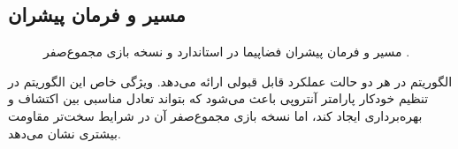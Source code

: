 \subsection{مسیر و فرمان پیشران}
\begin{figure}[H]
	\centering
	
	\caption{مسیر و فرمان پیشران فضاپیما در  استاندارد و نسخه بازی مجموع‌صفر .}
\end{figure}

الگوریتم  در هر دو حالت عملکرد قابل قبولی ارائه می‌دهد. ویژگی خاص این الگوریتم در تنظیم خودکار پارامتر آنتروپی باعث می‌شود که بتواند تعادل مناسبی بین اکتشاف و بهره‌برداری ایجاد کند، اما نسخه بازی مجموع‌صفر آن در شرایط سخت‌تر مقاومت بیشتری نشان می‌دهد.


